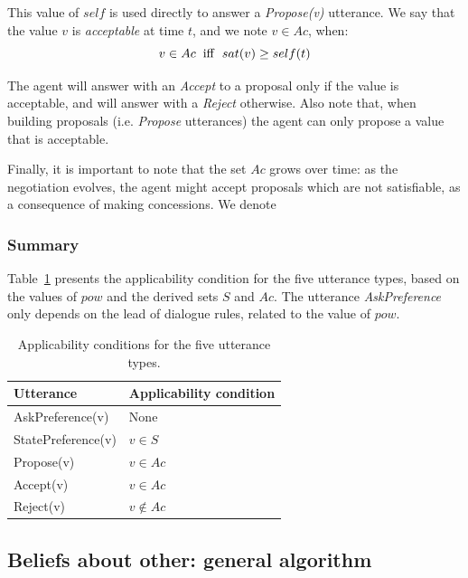 \documentclass[conference, letterpaper]{IEEEtran}
\begin{document}
	This value of $self$ is used directly to answer a \emph{Propose(v)} utterance. We say that the value $v$ is \emph{acceptable} at time $t$, and we note $v \in Ac$, when:
	\begin{equation}
	v\in Ac\hspace{2mm}\mathrm{iff}\hspace{2mm}sat(v) \geq self(t)
	\end{equation}
	
	The agent will answer with an \emph{Accept} to a proposal only if the value is acceptable, and will answer with a \emph{Reject} otherwise. Also note that, when building proposals (i.e. \emph{Propose} utterances) the agent can only propose a value that is acceptable.
	
	Finally, it is important to note that the set $Ac$ grows over time: as the negotiation evolves, the agent might accept proposals which are not satisfiable, as a consequence of making concessions. We denote %
	
	\subsubsection{Summary}	
	Table~\ref{tab:utt} presents the applicability condition for the five utterance types, based on the values of $pow$ and the derived sets $S$ and $Ac$. The utterance \emph{AskPreference} only depends on the lead of dialogue rules, related to the value of $pow$.
	
	\begin{table}
		\centering
		\caption{Applicability conditions for the five utterance types.}
		\label{tab:utt}
		\begin{tabular}  {|l|l|}
			\hline
			Utterance & Applicability condition \\
			\hline
			AskPreference(v) & None \\
			\hline 
			StatePreference(v) & $v\in S$ \\
			\hline 
			Propose(v) & $v\in Ac$ \\
			\hline
			Accept(v)  & $v\in Ac$ \\
			\hline
			Reject(v) & $v\notin Ac$ \\
			\hline
		\end{tabular}
	\end{table}
	
	\subsection{Beliefs about other: general algorithm}
	
\end{document}
